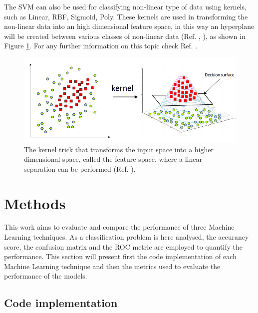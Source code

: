 \documentclass[english,notitlepage,reprint,nofootinbib]{revtex4-1}  %
\begin{document}
 
 
The SVM can also be used for classifying non-linear type of data using kernels, such as Linear, RBF, Sigmoid, Poly. These kernels are used in transforming the non-linear data into an high dimensional feature space, in this way an hyperplane will be created between various classes of non-linear data (Ref. \cite{svm3}, \cite{svm4}), as shown in Figure \ref{fig:kernel}. For any further information on this topic check Ref. \cite{svm1}.

 \begin{figure}[h]
    \centering 
    \includegraphics[scale=0.25]{img/kernel.png}
    \caption{The kernel trick that transforms the input space into a higher dimensional space, called the feature space, where a linear separation can be performed (Ref. \cite{svm1}).}
    \label{fig:kernel}
\end{figure}



\section{Methods} \label{sec:methods}

This work aims to evaluate and compare the performance of three Machine Learning techniques. As a classification problem is here analysed, the accurancy score, the confusion matrix and the ROC metric are employed to quantify the performance. This section will present first  the code implementation of each Machine Learning technique and then the metrics used to evaluate the performance of the models. 


\subsection{Code implementation}\label{sec:code}
\end{document}
